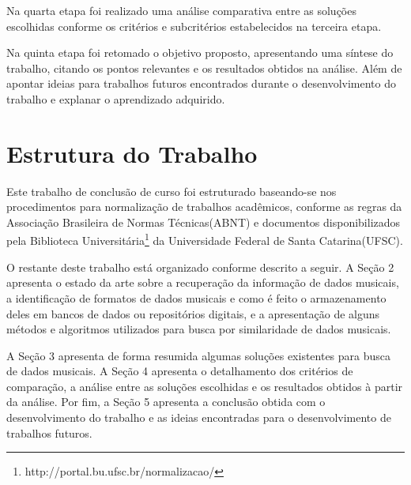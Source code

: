Na quarta etapa foi realizado uma análise comparativa entre as soluções escolhidas conforme os critérios e subcritérios estabelecidos na terceira etapa.

Na quinta etapa foi retomado o objetivo proposto, apresentando uma síntese do trabalho, citando os pontos relevantes e os resultados obtidos na análise. Além de apontar ideias para trabalhos futuros encontrados durante o desenvolvimento do trabalho e explanar o aprendizado adquirido.

\section{Estrutura do Trabalho} \label{sec:estrutura}

Este trabalho de conclusão de curso foi estruturado baseando-se nos procedimentos para normalização de trabalhos acadêmicos, conforme as regras da Associação Brasileira de Normas Técnicas(ABNT) e documentos disponibilizados pela Biblioteca Universitária\footnote{http://portal.bu.ufsc.br/normalizacao/} da Universidade Federal de Santa Catarina(UFSC).

O restante deste trabalho está organizado conforme descrito a seguir. A Seção 2 apresenta o estado da arte sobre a recuperação da informação de dados musicais, a identificação de formatos de dados musicais e como é feito o armazenamento deles em bancos de dados ou repositórios digitais, e a apresentação de alguns métodos e algoritmos utilizados para busca por similaridade de dados musicais.

A Seção 3 apresenta de forma resumida algumas soluções existentes para busca de dados musicais. A Seção 4 apresenta o detalhamento dos critérios de comparação, a análise entre as soluções escolhidas e os resultados obtidos à partir da análise. Por fim, a Seção 5 apresenta a conclusão obtida com o desenvolvimento do trabalho e as ideias encontradas para o desenvolvimento de trabalhos futuros.